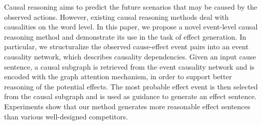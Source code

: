 Causal reasoning aims to predict the future scenarios that may be caused by the observed actions. However, existing causal reasoning methods deal with causalities on the word level. In this paper, we propose a novel event-level causal reasoning method and demonstrate its use in the task of effect generation. In particular, we structuralize the observed cause-effect event pairs into an event causality network, which describes causality dependencies. Given an input cause sentence, a causal subgraph is retrieved from the event causality network and is encoded with the graph attention mechanism, in order to support better reasoning of the potential effects. The most probable effect event is then selected from the causal subgraph and is used as guidance to generate an effect sentence. Experiments show that our method generates more reasonable effect sentences than various well-designed competitors.
